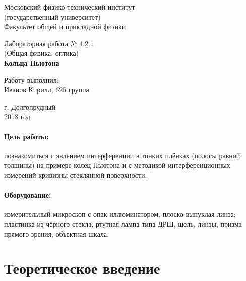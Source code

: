 \documentclass[12pt]{kiarticle}
\begin{document}
	
	\begin{titlepage}
	\begin{center}
		\large 	Московский физико-технический институт \\
		(государственный университет) \\
		Факультет общей и прикладной физики \\
		\vspace{0.2cm}
		
		\vspace{4.5cm}
		Лабораторная работа № 4.2.1 \\ \vspace{0.2cm}
		\large (Общая физика: оптика) \\ \vspace{0.2cm}
		\LARGE \textbf{Кольца Ньютона}
	\end{center}
	\vspace{2.3cm} \large
	
	\begin{center}
		Работу выполнил: \\
		Иванов Кирилл,
		625 группа
		\vspace{10mm}		
		
	\end{center}
	
	\begin{center} \vspace{60mm}
		г. Долгопрудный \\
		2018 год
	\end{center}
\end{titlepage}
	
	\paragraph*{Цель работы:} познакомиться с явлением интерференции в тонких плёнках (полосы равной толщины) на примере колец Ньютона и с методикой интерференционных измерений кривизны стеклянной поверхности.
	
	\paragraph*{Оборудование:} измерительный микроскоп с опак-иллюминатором, плоско-выпуклая линза; пластинка из чёрного стекла, ртутная лампа типа ДРШ, щель, линзы, призма прямого зрения, объектная шкала.
	
	\section{Теоретическое введение}
	
\end{document}
